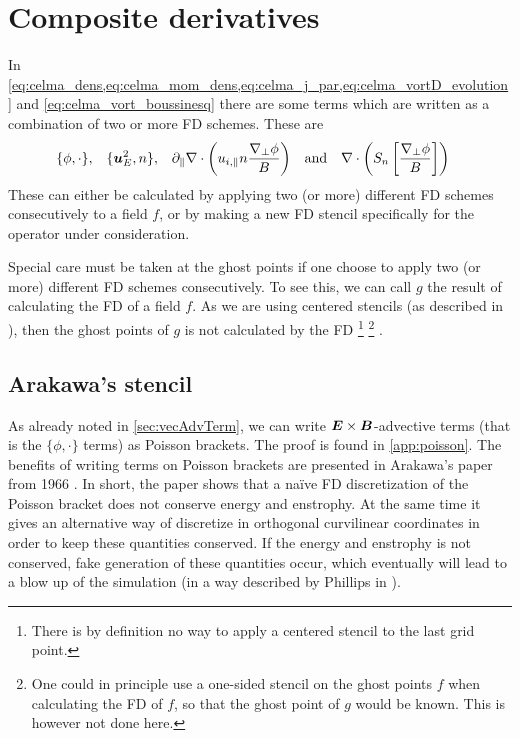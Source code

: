 \section{Composite derivatives}
\label{sec:compDeriv}
%
In \cref{eq:celma_dens,eq:celma_mom_dens,eq:celma_j_par,eq:celma_vortD_evolution} and \cref{eq:celma_vort_boussinesq} there are some terms which are written as a combination of two or more FD schemes.
These are
%
\begin{align*}
    &\{\phi,\cdot\},&
    &\{\boldsymbol{u}_E^2,n\},&
    &\partial_\|\nabla\cdot \left( u_{i,\|}n \frac{\nabla_\perp \phi}{B}\right)&
    &\text{and}&
    &\nabla\cdot \left( S_n \left[ \frac{ \nabla_\perp \phi }{ B } \right] \right)&
\end{align*}
%
These can either be calculated by applying two (or more) different FD schemes consecutively to a field $f$, or by making a new FD stencil specifically for the operator under consideration.

Special care must be taken at the ghost points if one choose to apply two (or more) different FD schemes consecutively.
To see this, we can call $g$ the result of calculating the FD of a field $f$.
As we are using centered stencils (as described in
), then the ghost points of $g$ is not calculated by the FD%
%
\footnote{There is by definition no way to apply a centered stencil to the last grid point.}%
%
\footnote{One could in principle use a one-sided stencil on the ghost points $f$ when calculating the FD of $f$, so that the ghost point of $g$ would be known.
This is however not done here.}
%
.

\subsection{Arakawa's stencil}
%
As already noted in \cref{sec:vecAdvTerm}, we can write $\boldsymbol{E}\times\boldsymbol{B}$-advective terms (that is the $\{\phi,\cdot\}$ terms) as Poisson brackets.
The proof is found in \cref{app:poisson}.
The benefits of writing terms on Poisson brackets are presented in Arakawa's paper from 1966 \cite{Arakwa1966}.
In short, the paper shows that a na\"ive FD discretization of the Poisson bracket does not conserve energy and enstrophy.
At the same time it gives an alternative way of discretize in orthogonal curvilinear coordinates in order to keep these quantities conserved.
If the energy and enstrophy is not conserved, fake generation of these quantities occur, which eventually will lead to a blow up of the simulation (in a way described by Phillips in \cite{Phillips1959}).

